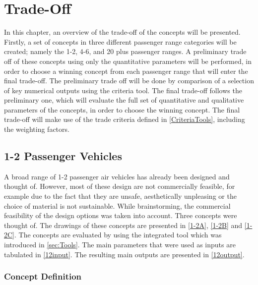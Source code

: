 \newpage
\chapter{Trade-Off}
\label{ch-tradeoff}


In this chapter, an overview of the trade-off of the concepts will be presented. Firstly, a set of concepts in three different passenger range categories will be created; namely the 1-2, 4-6, and 20 plus passenger ranges. A preliminary trade off of these concepts using only the quantitative parameters will be performed, in order to choose a winning concept from each passenger range that will enter the final trade-off. The preliminary trade off will be done by comparison of a selection of key numerical outputs using the criteria tool. The final trade-off follows the preliminary one, which will evaluate the full set of quantitative and qualitative parameters of the concepts, in order to choose the winning concept. The final trade-off will make use of the trade criteria defined in \autoref{CriteriaTools}, including the weighting factors. 


\section{1-2 Passenger Vehicles}
A broad range of 1-2 passenger air vehicles has already been designed and thought of. However, most of these design are not commercially feasible, for example due to the fact that they are unsafe, aesthetically unpleasing or the choice of material is not sustainable. While brainstorming, the commercial feasibility of the design options was taken into account. Three concepts were thought of. The drawings of these concepts are presented in \autoref{1-2A}, \autoref{1-2B} and \autoref{1-2C}. The concepts are evaluated by using the integrated tool which was introduced in \autoref{sec:Tools}. The main parameters that were used as inputs are tabulated in \autoref{12input}. The resulting main outputs are presented in \autoref{12output}. 

\subsection{Concept Definition}

